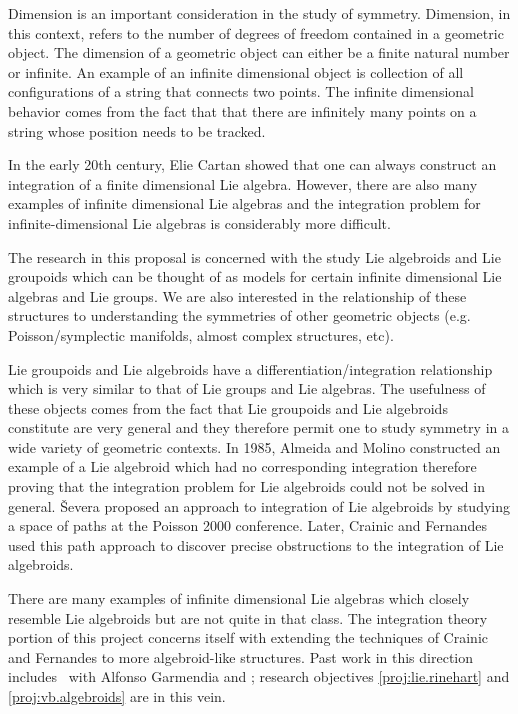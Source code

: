 \documentclass[11pt, letterpaper]{article}
\begin{document}
Dimension is an important consideration in the study of symmetry. Dimension, in this context, refers to the number of degrees of freedom contained in a geometric object. The dimension of a geometric object can either be a finite natural number or infinite. An example of an infinite dimensional object is collection of all configurations of a string that connects two points. The infinite dimensional behavior comes from the fact that that there are infinitely many points on a string whose position needs to be tracked. 

In the early 20th century, Elie Cartan showed that one can always construct an integration of a finite dimensional Lie algebra. However, there are also many examples of infinite dimensional Lie algebras and the integration problem for infinite-dimensional Lie algebras is considerably more difficult.

The research in this proposal is concerned with the study Lie algebroids and Lie groupoids which can be thought of as models for certain infinite dimensional Lie algebras and Lie groups. We are also interested in the relationship of these structures to understanding the symmetries of other geometric objects (e.g. Poisson/symplectic manifolds, almost complex structures, etc).

Lie groupoids and Lie algebroids have a differentiation/integration relationship which is very similar to that of Lie groups and Lie algebras. The usefulness of these objects comes from the fact that Lie groupoids and Lie algebroids constitute are very general and they therefore permit one to study symmetry in a wide variety of geometric contexts. In 1985, Almeida and Molino constructed an example of a Lie algebroid which had no corresponding integration therefore proving that the integration problem for Lie algebroids could not be solved in general. \v{S}evera proposed an approach to integration of Lie algebroids by studying a space of paths at the Poisson 2000 conference. Later, Crainic and Fernandes~\cite{Cint} used this path approach to discover precise obstructions to the integration of Lie algebroids.

There are many examples of infinite dimensional Lie algebras which closely resemble Lie algebroids but are not quite in that class. The integration theory portion of this project concerns itself with extending the techniques of Crainic and Fernandes to more algebroid-like structures. Past work in this direction includes~\cite{villatoro2019integration} with Alfonso Garmendia and \cite{fresh}; research objectives \ref{proj:lie.rinehart} and \ref{proj:vb.algebroids} are in this vein.
\end{document}
